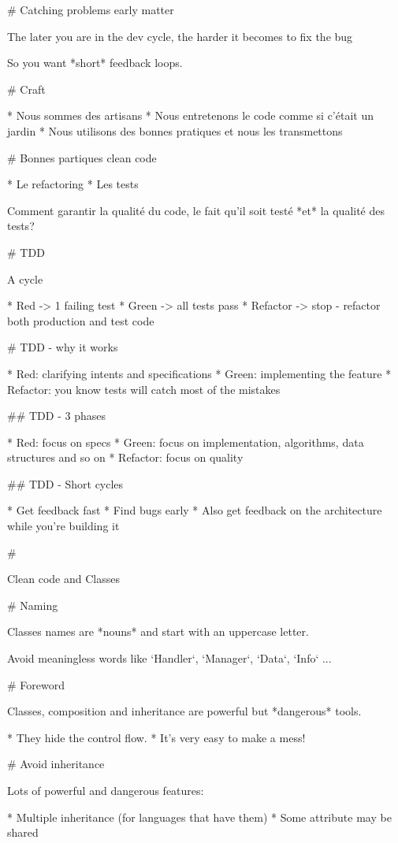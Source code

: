 # Catching problems early matter

The later you are in the dev cycle, the harder
it becomes to fix the bug

So you want *short* feedback loops.

# Craft

* Nous sommes des artisans
* Nous entretenons le code comme si c'était un jardin
* Nous utilisons des bonnes pratiques et nous les transmettons

# Bonnes partiques clean code

* Le refactoring
* Les tests

Comment garantir la qualité du code, le fait qu'il soit testé *et* la qualité des tests?

# TDD

A cycle

* Red -> 1 failing test
* Green -> all tests pass
* Refactor -> stop - refactor both production and test code



# TDD - why it works

* Red: clarifying intents and specifications
* Green: implementing the feature
* Refactor: you know tests will catch most of the mistakes

## TDD - 3 phases

* Red: focus on specs
* Green: focus on implementation, algorithms, data structures and so on
* Refactor: focus on quality

## TDD - Short cycles

 * Get feedback fast
 * Find bugs early
 * Also get feedback on the architecture while you're building it


#

\huge \center Clean code and Classes

# Naming

Classes names are *nouns* and start with an uppercase letter.

Avoid meaningless words like `Handler`, `Manager`, `Data`, `Info` ...

# Foreword

Classes, composition and inheritance are powerful but *dangerous* tools.

* They hide the control flow.
* It's very easy to make a mess!

# Avoid inheritance

Lots of powerful and dangerous features:

* Multiple inheritance (for languages that have them)
* Some attribute may be shared

